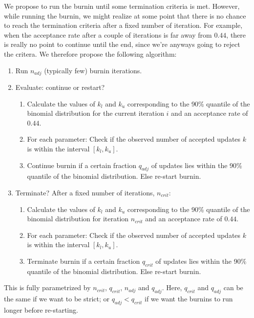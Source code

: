 \documentclass[a4paper,11pt]{article}
\begin{document}
We propose to run the burnin until some termination criteria is met. However, while running the burnin, we might realize at some point that there is no chance to reach the termination criteria after a fixed number of iteration. For example, when the acceptance rate after a couple of iterations is far away from $0.44$, there is really no point to continue until the end, since we're anyways going to reject the critera. We therefore propose the following algorithm:

\begin{enumerate}
 \item Run $n_{adj}$ (typically few) burnin iterations.
 \item Evaluate: continue or restart?
 \begin{enumerate}
   \item Calculate the values of $k_l$ and $k_u$ corresponding to the 90\% quantile of the binomial distribution for the current iteration $i$ and an acceptance rate of $0.44$.
   \item For each parameter: Check if the observed number of accepted updates $k$ is within the interval $[k_l, k_u]$.
  \item Continue burnin if a certain fraction $q_{adj}$ of updates lies within the 90\% quantile of the binomial distribution. Else re-start burnin.
 \end{enumerate}
 \item Terminate? After a fixed number of iterations, $n_{crit}$:
  \begin{enumerate}
     \item Calculate the values of $k_l$ and $k_u$ corresponding to the 90\% quantile of the binomial distribution for iteration $n_{crit}$ and an acceptance rate of $0.44$.
   \item For each parameter: Check if the observed number of accepted updates $k$ is within the interval $[k_l, k_u]$.
  \item Terminate burnin if a certain fraction $q_{crit}$ of updates lies within the 90\% quantile of the binomial distribution. Else re-start burnin.
 \end{enumerate}
\end{enumerate}

This is fully parametrized by $n_{crit}$, $q_{crit}$, $n_{adj}$ and $q_{adj}$. Here, $q_{crit}$ and $q_{adj}$ can be the same if we want to be strict; or  $q_{adj} < q_{crit}$ if we want the burnins to run longer before re-starting.

\printbibliography
\end{document}
